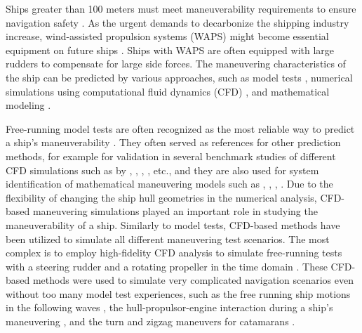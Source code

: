 Ships greater than 100 meters must meet maneuverability requirements to ensure navigation safety \citep{imoStandardsShipManoeuvrability2002}. As the urgent demands to decarbonize the shipping industry increase, wind-assisted propulsion systems (WAPS) might become essential equipment on future ships \citep{nelissenStudyAnalysisMarket2016}. Ships with WAPS are often equipped with large rudders to compensate for large side forces. The maneuvering characteristics of the ship can be predicted by various approaches, such as model tests \citep{ittcManeuveringCommitteeITTC2008}, numerical simulations using computational fluid dynamics (CFD) \citep{elmoctarRANSBasedSimulatedShip2014,dumanTurnZigzagManoeuvres2022}, and mathematical modeling \citep{abkowitzMEASUREMENTHYDRODYNAMICCHARACTERISTICS1980,fossenHandbookMarineCraft2011,yasukawaIntroductionMMGStandard2015,alexanderssonSystemIdentificationPhysicsinformed2024b}. 

Free-running model tests are often recognized as the most reliable way to predict a ship's maneuverability \citep{ittcITTCRecommendedProcedures2008}. They often served as references for other prediction methods, for example for validation in several benchmark studies of different CFD simulations such as by \citet{sternExperienceSIMMAN20082011}, \citet{sakamotoURANSSimulationsStatic2012}, \citet{yoonBenchmarkCFDValidation2015a}, \citet{yasukawaValidation6DOFMotion2021}, etc., and they are also used for system identification of mathematical maneuvering models such as \citet{luoParameterIdentificationShip2016}, \citet{xuUncertaintyAnalysisHydrodynamic2019}, \citet{wangOptimalDesignExcitation2020}, \citet{alexanderssonSystemIdentificationVessel2022}. Due to the flexibility of changing the ship hull geometries in the numerical analysis, CFD-based maneuvering simulations played an important role in studying the maneuverability of a ship. Similarly to model tests, CFD-based methods have been utilized to simulate all different maneuvering test scenarios. The most complex is to employ high-fidelity CFD analysis to simulate free-running tests with a steering rudder and a rotating propeller in the time domain \citep{dubbiosoTurningAbilityAnalysis2016a, islamEstimationHydrodynamicDerivatives2018}. These CFD-based methods were used to simulate very complicated navigation scenarios even without too many model test experiences, such as the free running ship motions in the following waves \citep{arakiImprovedManeuveringBasedMathematical2019}, the hull-propulsor-engine interaction during a ship’s maneuvering \citep{elmoctarRANSBasedSimulatedShip2014}, and the turn and zigzag maneuvers for catamarans \citep{dumanTurnZigzagManoeuvres2022}.

